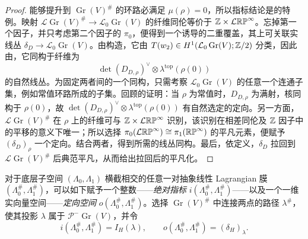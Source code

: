\begin{proof}
能够提升到 $\operatorname{Gr}(V)^\#$ 的环路必满足 $\mu(\rho)=0$，所以指标结论是的特例。映射 $\mathcal L\operatorname{Gr}(V)^\#\to\mathcal L_0\operatorname{Gr}(V)$ 的纤维同伦等价于 $\mathbb Z\times\mathcal L\mathbb{RP}^\infty$。忘掉第一个因子，并只考虑第二个因子的 $\pi_0$，便得到一个诱导的二重覆盖，其上可关联实线丛 $\delta_D\to\mathcal L_0\operatorname{Gr}(V)$。由构造，它由 $T(w_2)\in H^1(\mathcal L_0\operatorname{Gr}(V);\mathbb Z/2)$ 分类，因此由，它同构于纤维为
\begin{equation}\label{eq:11.24}
\det(D_{D,\rho})^\vee\otimes\lambda^{\mathrm{top}}(\rho(0))
\end{equation}
的自然线丛。为固定两者间的一个同构，只需考察 $\mathcal L_0\operatorname{Gr}(V)$ 的任意一个连通子集，例如常值环路所成的子集。回顾的证明：当 $\rho$ 为常值时，$D_{D,\allowbreak \rho}$ 为满射，核同构于 $\rho(0)$，故 $\det(D_{D,\allowbreak \rho})^\vee\otimes\lambda^{\mathrm{top}}(\rho(0))$ 有自然选定的定向。另一方面，$\mathcal L\operatorname{Gr}(V)^\#$ 在 $\rho$ 上的纤维可与 $\mathbb Z\times\mathcal L\mathbb{RP}^\infty$ 识别，该识别在相差同伦及 $\mathbb Z$ 因子中的平移的意义下唯一；所以选择 $\pi_0(\mathcal L\mathbb{RP}^\infty)\cong\pi_1(\mathbb{RP}^\infty)$ 的平凡元素，便赋予 $(\delta_D)_\rho$ 一个定向。结合两者，得到所需的线丛同构。最后，依定义，$\delta_D$ 拉回到 $\mathcal L\operatorname{Gr}(V)^\#$ 后典范平凡，从而给出拉回后的平凡化。
\end{proof}
对于底层子空间 $(\Lambda_0,\allowbreak \Lambda_1)$ 横截相交的任意一对抽象线性 Lagrangian 膜 $(\Lambda_0^\#,\allowbreak \Lambda_1^\#)$，可以如下赋予一个整数——\emph{绝对指标} $i(\Lambda_0^\#,\allowbreak \Lambda_1^\#)$——以及一个一维实向量空间——\emph{定向空间} $o(\Lambda_0^\#,\allowbreak \Lambda_1^\#)$。选择 $\operatorname{Gr}(V)^\#$ 中连接两点的路径 $\lambda^\#$，使其投影 $\lambda$ 属于 $\mathcal P^-\operatorname{Gr}(V)$，并令
\begin{equation}\label{eq:11.25}
i(\Lambda_0^\#,\Lambda_1^\#)=I_H(\lambda),\qquad o(\Lambda_0^\#,\Lambda_1^\#)=(\delta_H)_\lambda.
\end{equation}
